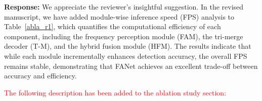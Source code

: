 \documentclass[lettersize,journal,onecolumn,12pt]{IEEEtran}
\begin{document}
\textbf{Response:} 
We appreciate the reviewer’s insightful suggestion. 
In the revised manuscript, we have added module-wise inference speed (FPS) analysis to Table~\ref{abla_r1}, 
which quantifies the computational efficiency of each component, including the frequency perception module (FAM), 
the tri-merge decoder (T-M), and the hybrid fusion module (HFM). 
The results indicate that while each module incrementally enhances detection accuracy, 
the overall FPS remains stable, demonstrating that FANet achieves an excellent trade-off between accuracy and efficiency. 

\textcolor{red}{The following description has been added to the ablation study section:} 





\begin{table}[]
\centering
\caption{{\textcolor{red}{Ablation studies of the proposed FANet on three datasets (GAPS384, Crack500, and CFD).
We report AIU, AP, F1, and FPS to analyze the impact of each module and the contribution of frequency components (Low-Freq, High-Freq, and Full) in FAM.
The results demonstrate that both high- and low-frequency cues improve performance, while the integration of HFM achieves the best balance between accuracy and efficiency.}}}
\end{table}
\end{document}
